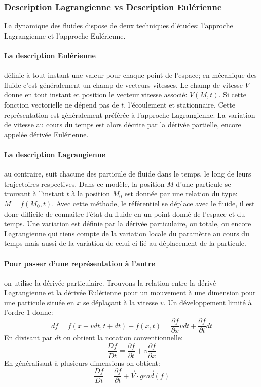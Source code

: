 \documentclass[10pt,a4paper]{article}
\begin{document}
\subsubsection{Description Lagrangienne vs Description Eulérienne}
La dynamique des fluides dispose de deux techniques d'études: l'approche Lagrangienne et l'approche Eulérienne.

\paragraph{La description Eulérienne\cite{desceuler}} définie à tout instant une valeur pour chaque point de l'espace; en mécanique des fluide c'est généralement un champ de vecteurs vitesses. Le champ de vitesse $V$ donne en tout instant et position le vecteur vitesse associé: $V(M, t)$. Si cette fonction vectorielle ne dépend pas de $t$, l'écoulement et stationnaire. Cette représentation est généralement préférée à l'approche Lagrangienne. La variation de vitesse au cours du temps est alors décrite par la dérivée partielle, encore appelée dérivée Eulérienne.

\paragraph{La description Lagrangienne\cite{desclagrange}} au contraire, suit chacune des particule de fluide dans le temps, le long de leurs trajectoires respectives. Dans ce modèle, la position $M$ d'une particule se trouvant à l'instant $t$ à la position $M_{0}$ est donnée par une relation du type: $M = f(M_{0}, t)$. Avec cette méthode, le référentiel se déplace avec le fluide, il est donc difficile de connaitre l'état du fluide en un point donné de l'espace et du temps. Une variation est définie par la dérivée particulaire, ou totale, ou encore Lagrangienne qui tiens compte de la variation locale du paramètre au cours du temps mais aussi de la variation de celui-ci lié au déplacement de la particule.

\paragraph{Pour passer d'une représentation à l'autre} on utilise la dérivée particulaire. Trouvons la relation entre la dérivé Lagrangienne et la dérivée Eulérienne pour un mouvement à une dimension pour une particule située en $x$ se déplaçant à la vitesse $v$. Un développement limité à l'ordre 1 donne:
\begin{equation}
df = f(x+vdt, t+dt) - f(x, t) = \frac{\partial f}{\partial x} vdt + \frac{\partial f}{\partial t} dt
\end{equation}
En divisant par $dt$ on obtient la notation conventionnelle:\begin{equation}
\frac{Df}{Dt} = \frac{\partial f}{\partial t} + v \frac{\partial f}{\partial x}
\end{equation}
En généralisant à plusieurs dimensions on obtient:
\begin{equation}
\frac{Df}{Dt} = \frac{\partial f}{\partial t} + \overrightarrow{V}\cdot\overrightarrow{grad}(f)
\end{equation}
\end{document}

